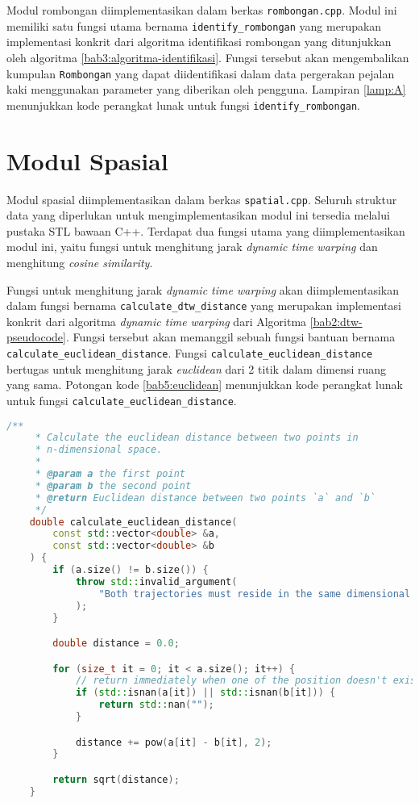 Modul rombongan diimplementasikan dalam berkas \texttt{rombongan.cpp}. Modul ini memiliki satu fungsi utama bernama \texttt{identify\_rombongan} yang merupakan implementasi konkrit dari algoritma identifikasi rombongan yang ditunjukkan oleh algoritma \ref{bab3:algoritma-identifikasi}. Fungsi tersebut akan mengembalikan kumpulan \texttt{Rombongan} yang dapat diidentifikasi dalam data pergerakan pejalan kaki menggunakan parameter yang diberikan oleh pengguna. Lampiran \ref{lamp:A} menunjukkan kode perangkat lunak untuk fungsi \texttt{identify\_rombongan}.

\section{Modul Spasial}

Modul spasial diimplementasikan dalam berkas \texttt{spatial.cpp}. Seluruh struktur data yang diperlukan untuk mengimplementasikan modul ini tersedia melalui pustaka STL bawaan C++. Terdapat dua fungsi utama yang diimplementasikan modul ini, yaitu fungsi untuk menghitung jarak \textit{dynamic time warping} dan menghitung \textit{cosine similarity}.

Fungsi untuk menghitung jarak \textit{dynamic time warping} akan diimplementasikan dalam fungsi bernama \texttt{calculate\_dtw\_distance} yang merupakan implementasi konkrit dari algoritma \textit{dynamic time warping} dari Algoritma \ref{bab2:dtw-pseudocode}. Fungsi tersebut akan memanggil sebuah fungsi bantuan bernama \texttt{calculate\_euclidean\_distance}. Fungsi \texttt{calculate\_euclidean\_distance} bertugas untuk menghitung jarak \textit{euclidean} dari 2 titik dalam dimensi ruang yang sama. Potongan kode \ref{bab5:euclidean} menunjukkan kode perangkat lunak untuk fungsi \texttt{calculate\_euclidean\_distance}.

\begin{lstlisting}[language=C++, caption=Implementasi fungsi \texttt{calculate\_euclidean\_distance}, label={bab5:euclidean}]
    /**
     * Calculate the euclidean distance between two points in
     * n-dimensional space.
     * 
     * @param a the first point
     * @param b the second point
     * @return Euclidean distance between two points `a` and `b`
     */
    double calculate_euclidean_distance(
        const std::vector<double> &a,
        const std::vector<double> &b
    ) {
        if (a.size() != b.size()) {
            throw std::invalid_argument(
                "Both trajectories must reside in the same dimensional space."
            );
        }

        double distance = 0.0;

        for (size_t it = 0; it < a.size(); it++) {
            // return immediately when one of the position doesn't exist
            if (std::isnan(a[it]) || std::isnan(b[it])) {
                return std::nan("");
            }

            distance += pow(a[it] - b[it], 2);
        }

        return sqrt(distance);
    }
\end{lstlisting}

